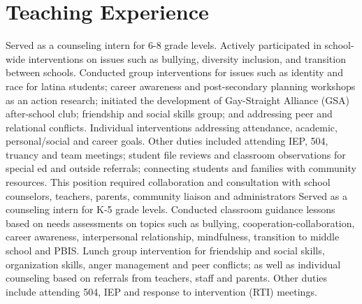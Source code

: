 \documentclass[11pt,a4paper]{moderncv}
\begin{document}
\section{Teaching Experience}
{Served as a counseling intern for 6-8 grade levels. Actively participated in school-wide interventions on issues such as bullying, diversity inclusion, and transition between schools. Conducted group interventions for issues such as identity and race for latina students; career awareness and post-secondary planning workshops as an action research; initiated the development of Gay-Straight Alliance (GSA) after-school club; friendship and social skills group; and addressing peer and relational conflicts. Individual interventions addressing attendance, academic, personal/social and career goals. Other duties included attending IEP, 504, truancy and team meetings; student file reviews and classroom observations for special ed and outside referrals; connecting students and families with community resources. This position required collaboration and consultation with school counselors, teachers, parents, community liaison and administrators}{}{}
{Served as a counseling intern for K-5 grade levels. Conducted classroom guidance lessons based on needs assessments on topics such as bullying, cooperation-collaboration, career awareness, interpersonal relationship, mindfulness, transition to middle school and PBIS. Lunch group intervention for friendship and social skills, organization skills, anger management and peer conflicts; as well as individual counseling based on referrals from teachers, staff and parents. Other duties include attending 504, IEP and response to intervention (RTI) meetings.}{}{}

%
\end{document}
